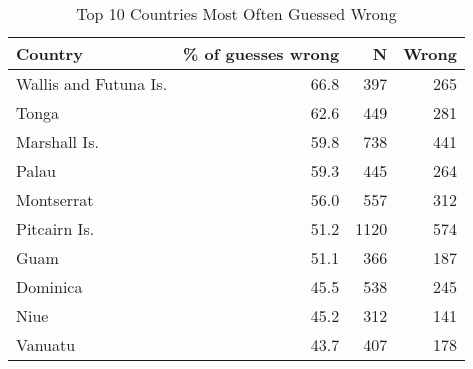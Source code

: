 \begin{table}[htbp]
\centering
\caption{Top 10 Countries Most Often Guessed Wrong}
\label{tab:wrong-guesses}
\begin{tabular}{lrrr}
\toprule
Country & \% of guesses wrong & N & Wrong \\
\midrule
Wallis and Futuna Is. & 66.8 & 397 & 265 \\
Tonga & 62.6 & 449 & 281 \\
Marshall Is. & 59.8 & 738 & 441 \\
Palau & 59.3 & 445 & 264 \\
Montserrat & 56.0 & 557 & 312 \\
Pitcairn Is. & 51.2 & 1120 & 574 \\
Guam & 51.1 & 366 & 187 \\
Dominica & 45.5 & 538 & 245 \\
Niue & 45.2 & 312 & 141 \\
Vanuatu & 43.7 & 407 & 178 \\
\bottomrule
\end{tabular}
\end{table}